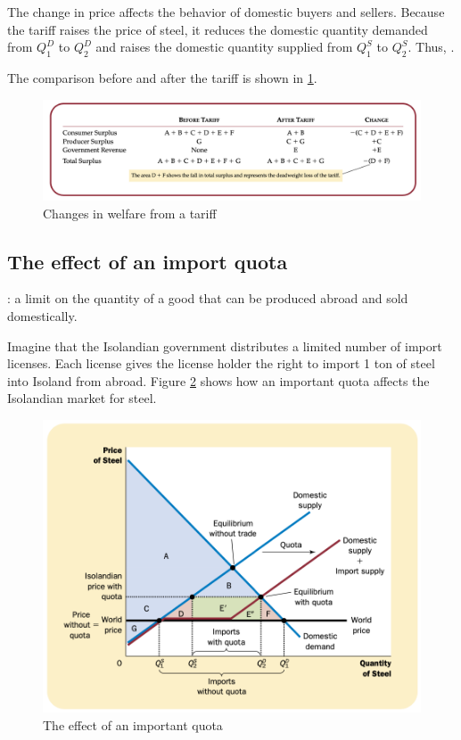 The change in price affects the behavior of domestic buyers and sellers.
Because the tariff raises the price of steel, it reduces the domestic quantity demanded from $Q_1^D $ to $Q_2^D$ and raises the domestic quantity supplied from $Q_1^S$ to $Q_2^S$.
Thus, .



The comparison before and after the tariff is shown in \ref{fig:changes-in-welfare-from-a-tariff}.

\begin{figure}[!ht]
  \centering
  \includegraphics[width=\textwidth]{pics/changes-in-welfare-from-a-tariff}
  \caption{Changes in welfare from a tariff}
  \label{fig:changes-in-welfare-from-a-tariff}
\end{figure}



\subsection{The effect of an import quota}

: a limit on the quantity of a good that can be produced abroad and sold domestically.


Imagine that the Isolandian government distributes a limited number of import licenses. Each license gives the license holder the right to import 1 ton of steel into Isoland from abroad.
Figure \ref{fig:the-effect-of-an-important-quota} shows how an important quota affects the Isolandian market for steel.

\begin{figure}[!ht]
  \centering
  \includegraphics[width=\textwidth]{pics/the-effect-of-an-import-quota}
  \caption{The effect of an important quota}
  \label{fig:the-effect-of-an-important-quota}
\end{figure}


